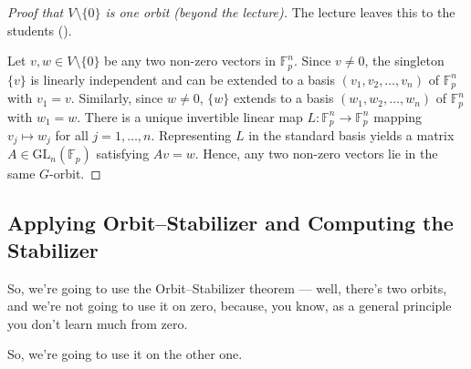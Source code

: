 \begin{content}
\begin{center}
\end{center}

\begin{proof}[Proof that \texorpdfstring{$V \setminus \{0\}$}{V - \{0\}} is one orbit (beyond the lecture)]
The lecture leaves this to the students ().

Let $v, w \in V \setminus \{0\}$ be any two non-zero vectors in $\mathbb{F}_p^n$. Since $v \neq 0$, the singleton $\{v\}$ is linearly independent and can be extended to a basis $(v_1, v_2, \dots, v_n)$ of $\mathbb{F}_p^n$ with $v_1 = v$. Similarly, since $w \neq 0$, $\{w\}$ extends to a basis $(w_1, w_2, \dots, w_n)$ of $\mathbb{F}_p^n$ with $w_1 = w$. There is a unique invertible linear map $L \colon \mathbb{F}_p^n \to \mathbb{F}_p^n$ mapping $v_j \mapsto w_j$ for all $j = 1, \dots, n$. Representing $L$ in the standard basis yields a matrix $A \in \mathrm{GL}_n(\mathbb{F}_p)$ satisfying $Av = w$. Hence, any two non-zero vectors lie in the same $G$-orbit.
\end{proof}
\end{content}

\subsection{Applying Orbit--Stabilizer and Computing the Stabilizer}

\begin{speech}[01:12:43 - 01:12:54]
So, we're going to use the Orbit--Stabilizer theorem --- well, there's two orbits, and we're not going to use it on zero, because, you know, as a general principle you don't learn much from zero.

So, we're going to use it on the other one.
\end{speech}

